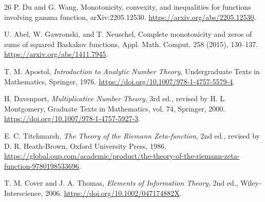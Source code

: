 \documentclass[11pt]{article}
\numberwithin{equation}{section}
\theoremstyle{definition}
\theoremstyle{remark}
\newcommand{\1}{\mathbf 1}
\begin{document}
\begin{thebibliography}{26}
P. Du and G. Wang,
\newblock Monotonicity, convexity, and inequalities for functions involving
  gamma function,
\newblock arXiv:2205.12530.
\url{https://arxiv.org/abs/2205.12530}.

U. Abel, W. Gawronski, and T. Neuschel,
\newblock Complete monotonicity and zeros of sums of squared Baskakov
  functions,
\newblock Appl. Math. Comput. 258 (2015), 130--137.
\url{https://arxiv.org/abs/1411.7945}.

T. M. Apostol,
\emph{Introduction to Analytic Number Theory},
Undergraduate Texts in Mathematics, Springer, 1976.
\url{https://doi.org/10.1007/978-1-4757-5579-4}.

H. Davenport,
\emph{Multiplicative Number Theory},
3rd ed., revised by H. L. Montgomery, Graduate Texts in Mathematics, vol. 74, Springer, 2000.
\url{https://doi.org/10.1007/978-1-4757-5927-3}.

E. C. Titchmarsh,
\emph{The Theory of the Riemann Zeta-function},
2nd ed., revised by D. R. Heath-Brown, Oxford University Press, 1986.
\url{https://global.oup.com/academic/product/the-theory-of-the-riemann-zeta-function-9780198533696}.

T. M. Cover and J. A. Thomas,
\emph{Elements of Information Theory},
2nd ed., Wiley-Interscience, 2006.
\url{https://doi.org/10.1002/047174882X}.

\end{thebibliography}
\end{document}
